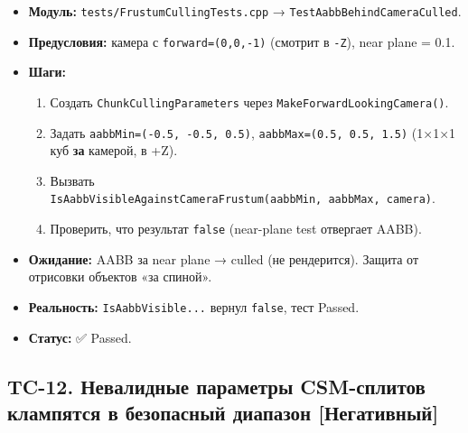 \begin{itemize}
\tightlist
\item
  \textbf{Модуль:} \texttt{tests/FrustumCullingTests.cpp} → \texttt{TestAabbBehindCameraCulled}.
\item
  \textbf{Предусловия:} камера с \texttt{forward=(0,0,-1)} (смотрит в \texttt{-Z}), near plane = 0.1.
\item
  \textbf{Шаги:}

  \begin{enumerate}
  \def\labelenumi{\arabic{enumi}.}
  \tightlist
  \item
    Создать \texttt{ChunkCullingParameters} через \texttt{MakeForwardLookingCamera()}.
  \item
    Задать \texttt{aabbMin=(-0.5,\ -0.5,\ 0.5)}, \texttt{aabbMax=(0.5,\ 0.5,\ 1.5)} (1×1×1 куб \textbf{за} камерой, в +Z).
  \item
    Вызвать \texttt{IsAabbVisibleAgainstCameraFrustum(aabbMin,\ aabbMax,\ camera)}.
  \item
    Проверить, что результат \texttt{false} (near-plane test отвергает AABB).
  \end{enumerate}
\item
  \textbf{Ожидание:} AABB за near plane → culled (не рендерится). Защита от отрисовки объектов «за спиной».
\item
  \textbf{Реальность:} \texttt{IsAabbVisible...} вернул \texttt{false}, тест Passed.
\item
  \textbf{Статус:} ✅ Passed.
\end{itemize}

\subsection{TC-12. Невалидные параметры CSM-сплитов клампятся в безопасный диапазон {[}Негативный{]}}\label{KT-2.2_Test_Report-tc-12-ux43dux435ux432ux430ux43bux438ux434ux43dux44bux435-ux43fux430ux440ux430ux43cux435ux442ux440ux44b-csm-ux441ux43fux43bux438ux442ux43eux432-ux43aux43bux430ux43cux43fux44fux442ux441ux44f-ux432-ux431ux435ux437ux43eux43fux430ux441ux43dux44bux439-ux434ux438ux430ux43fux430ux437ux43eux43d-ux43dux435ux433ux430ux442ux438ux432ux43dux44bux439}

